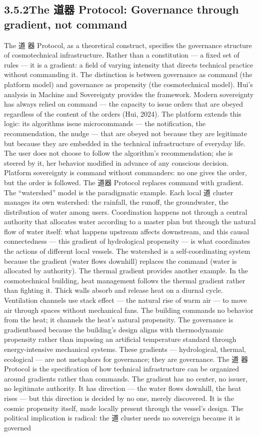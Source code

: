 \subsection{3.5.2\quad The 道器 Protocol: Governance through gradient, not command}

The 道 器 Protocol, as a theoretical construct, specifies the governance structure of cosmotechnical infrastructure. Rather than a constitution — a fixed set of rules — it is a gradient: a field of varying intensity that directs technical practice without commanding it. The distinction is between governance as command (the platform model) and governance as propensity (the cosmotechnical model). Hui’s analysis in Machine and Sovereignty provides the framework. Modern sovereignty has always relied on command — the capacity to issue orders that are obeyed regardless of the content of the orders (Hui, 2024). The platform extends this logic: its algorithms issue microcommands — the notification, the recommendation, the nudge — that are obeyed not because they are legitimate but because they are embedded in the technical infrastructure of everyday life. The user does not choose to follow the algorithm’s recommendation; she is steered by it, her behavior modified in advance of any conscious decision. Platform sovereignty is command without commanders: no one gives the order, but the order is followed. The 道器 Protocol replaces command with gradient. The “watershed” model is the paradigmatic example. Each local 道 cluster manages its own watershed: the rainfall, the runoff, the groundwater, the distribution of water among users. Coordination happens not through a central authority that allocates water according to a master plan but through the natural flow of water itself: what happens upstream affects downstream, and this causal connectedness — this gradient of hydrological propensity — is what coordinates the actions of different local vessels. The watershed is a self-coordinating system because the gradient (water flows downhill) replaces the command (water is allocated by authority). The thermal gradient provides another example. In the cosmotechnical building, heat management follows the thermal gradient rather than fighting it. Thick walls absorb and release heat on a diurnal cycle. Ventilation channels use stack effect — the natural rise of warm air — to move air through spaces without mechanical fans. The building commands no behavior from the heat; it channels the heat’s natural propensity. The governance is gradientbased because the building’s design aligns with thermodynamic propensity rather than imposing an artificial temperature standard through energy-intensive mechanical systems. These gradients — hydrological, thermal, ecological — are not metaphors for governance; they are governance. The 道 器 Protocol is the specification of how technical infrastructure can be organized around gradients rather than commands. The gradient has no center, no issuer, no legitimate authority. It has direction — the water flows downhill, the heat rises — but this direction is decided by no one, merely discovered. It is the cosmic propensity itself, made locally present through the vessel’s design. The political implication is radical: the 道 cluster needs no sovereign because it is governed 